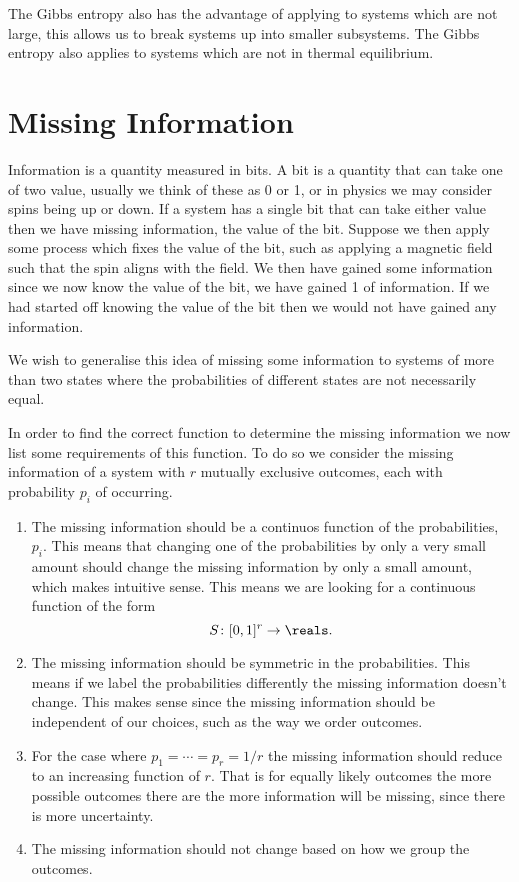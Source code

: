 \documentclass[fleqn]{NotesClass}
\begin{document}
    The Gibbs entropy also has the advantage of applying to systems which are not large, this allows us to break systems up into smaller subsystems.
    The Gibbs entropy also applies to systems which are not in thermal equilibrium.
    
    \section{Missing Information}
    Information is a quantity measured in bits.
    A bit is a quantity that can take one of two value, usually we think of these as 0 or 1, or in physics we may consider spins being up or down.
    If a system has a single bit that can take either value then we have missing information, the value of the bit.
    Suppose we then apply some process which fixes the value of the bit, such as applying a magnetic field such that the spin aligns with the field.
    We then have gained some information since we now know the value of the bit, we have gained \qty{1}{\bit} of information.
    If we had started off knowing the value of the bit then we would not have gained any information.
    
    We wish to generalise this idea of missing some information to systems of more than two states where the probabilities of different states are not necessarily equal.
    
    In order to find the correct function to determine the missing information we now list some requirements of this function.
    To do so we consider the missing information of a system with \(r\) mutually exclusive outcomes, each with probability \(p_i\) of occurring.
    \begin{enumerate}
        \item The missing information should be a continuos function of the probabilities, \(p_i\).
        This means that changing one of the probabilities by only a very small amount should change the missing information by only a small amount, which makes intuitive sense.
        This means we are looking for a continuous function of the form
        \begin{equation}
            S \colon [0, 1]^r \to \reals.
        \end{equation}
        \item The missing information should be symmetric in the probabilities.
        This means if we label the probabilities differently the missing information doesn't change.
        This makes sense since the missing information should be independent of our choices, such as the way we order outcomes.
        \item For the case where \(p_1 = \dotsb = p_r = 1/r\) the missing information should reduce to an increasing function of \(r\).
        That is for equally likely outcomes the more possible outcomes there are the more information will be missing, since there is more uncertainty.
        \item The missing information should not change based on how we group the outcomes.
    \end{enumerate}
    
\end{document}
